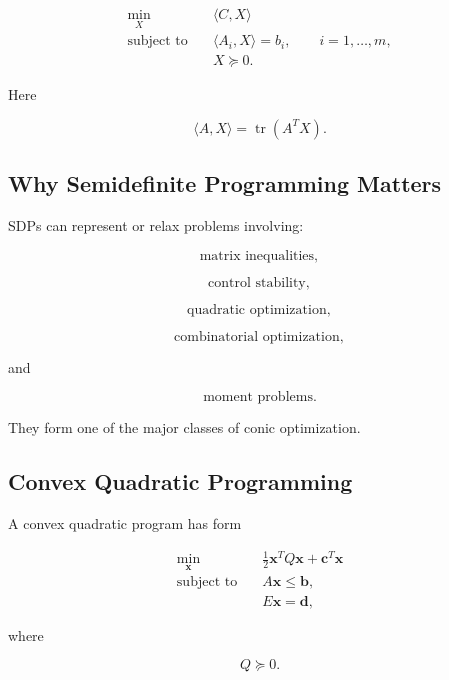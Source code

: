 \[
\boxed{
\begin{aligned}
\min_X
\quad&
\langle C,X\rangle
\\
\text{subject to}
\quad&
\langle A_i,X\rangle=b_i,
\qquad
i=1,\ldots,m,
\\
&
X\succeq0.
\end{aligned}
}
\]

Here

\[
\boxed{
\langle A,X\rangle
=
\operatorname{tr}(A^TX).
}
\]

\subsection{Why Semidefinite Programming Matters}
\label{subsec:why-sdp-matters}

SDPs can represent or relax problems involving:

\[
\boxed{
\text{matrix inequalities},
}
\]

\[
\boxed{
\text{control stability},
}
\]

\[
\boxed{
\text{quadratic optimization},
}
\]

\[
\boxed{
\text{combinatorial optimization},
}
\]

and

\[
\boxed{
\text{moment problems}.
}
\]

They form one of the major classes of conic optimization.

\subsection{Convex Quadratic Programming}
\label{subsec:convex-quadratic-programming}

A convex quadratic program has form

\[
\boxed{
\begin{aligned}
\min_{\mathbf{x}}
\quad&
\frac12
\mathbf{x}^TQ\mathbf{x}
+
\mathbf{c}^T\mathbf{x}
\\
\text{subject to}
\quad&
A\mathbf{x}\leq\mathbf{b},
\\
&
E\mathbf{x}=\mathbf{d},
\end{aligned}
}
\]

where

\[
\boxed{
Q\succeq0.
}
\]

